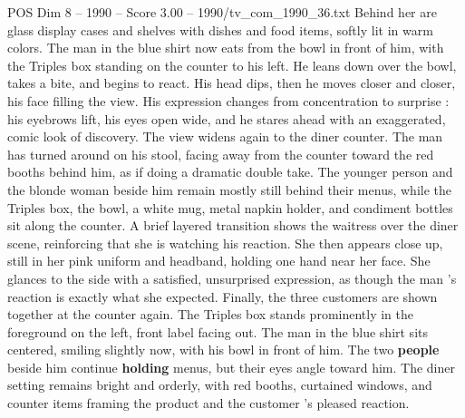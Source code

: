 \begin{textsample}{POS Dim 8 – 1990 – Score 3.00 – 1990/tv\_com\_1990\_36.txt}
Behind her are glass display cases and shelves with dishes and food items, softly lit in warm colors.
The man in the blue shirt now eats from the bowl in front of him, with the Triples box standing on the counter to his left.
He leans down over the bowl, takes a bite, and begins to react.
His head dips, then he moves closer and closer, his face filling the view.
His expression changes from concentration to surprise : his eyebrows lift, his eyes open wide, and he stares ahead with an exaggerated, comic look of discovery.
The view widens again to the diner counter.
The man has turned around on his stool, facing away from the counter toward the red booths behind him, as if doing a dramatic double take.
The younger person and the blonde woman beside him remain mostly still behind their menus, while the Triples box, the bowl, a white mug, metal napkin holder, and condiment bottles sit along the counter.
A brief layered transition shows the waitress over the diner scene, reinforcing that she is watching his reaction.
She then appears close up, still in her pink uniform and headband, holding one hand near her face.
She glances to the side with a satisfied, unsurprised expression, as though the man ’s reaction is exactly what she expected.
Finally, the three customers are shown together at the counter again.
The Triples box stands prominently in the foreground on the left, front label facing out.
The man in the blue shirt sits centered, smiling slightly now, with his bowl in front of him.
The two \textbf{people} beside him continue \textbf{holding} menus, but their eyes angle toward him.
The diner setting remains bright and orderly, with red booths, curtained windows, and counter items framing the product and the customer ’s pleased reaction.

\end{textsample}
